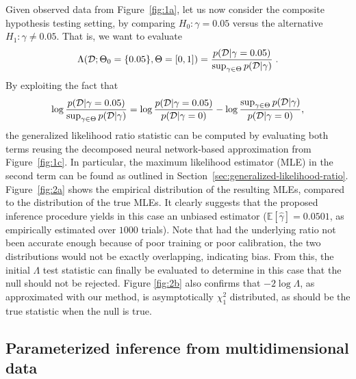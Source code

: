 \documentclass[12pt]{article}
\numberwithin{equation}{section}
\theoremstyle{plain}
\begin{document}
Given observed data from Figure~\ref{fig:1a}, let us now consider the composite hypothesis testing setting, by comparing
$H_0: \gamma = 0.05$ versus the alternative $H_1: \gamma \neq 0.05$. That is, we want to evaluate
\begin{equation}
\Lambda({\cal D}; \Theta_0 = \{0.05\}, \Theta=[0, 1]) =  \frac{ p({\cal D} | \gamma = 0.05) }{ \sup_{\gamma \in \Theta} p({\cal D} | \gamma )} \; .
\end{equation}
By exploiting the fact that
\begin{equation}
\log \frac{ p({\cal D} | \gamma = 0.05) }{ \sup_{\gamma \in \Theta} p({\cal D} | \gamma )} = \log \frac{ p({\cal D} | \gamma = 0.05) }{ p({\cal D} | \gamma = 0 ) } - \log \frac{ \sup_{\gamma \in \Theta} p({\cal D} | \gamma) }{  p({\cal D} | \gamma = 0 ) },
\end{equation}
the generalized likelihood ratio statistic can be computed by evaluating
both terms reusing the decomposed neural network-based approximation from Figure~\ref{fig:1c}.
In particular, the maximum likelihood estimator (MLE) in the second term
can be found as outlined in
Section~\ref{sec:generalized-likelihood-ratio}.
Figure~\ref{fig:2a} shows the empirical distribution of the resulting MLEs,
compared to the distribution of the true MLEs. It clearly suggests that
the proposed inference procedure yields in this case an unbiased estimator
($\mathbb{E} [\hat \gamma] = 0.0501$, as empirically estimated over $1000$
trials). Note that had the underlying ratio not been accurate enough because of
poor training or poor calibration, the two distributions would not be exactly
overlapping, indicating bias. From this, the initial $\Lambda$ test statistic can finally
be evaluated to determine in this case that the null should not be rejected.  Figure \ref{fig:2b} also confirms
that $-2 \log \Lambda$, as approximated with our method, is asymptotically $\chi^2_1$ distributed,
as should be the true statistic when the null is true.


\subsection{Parameterized inference from multidimensional data}
\end{document}
